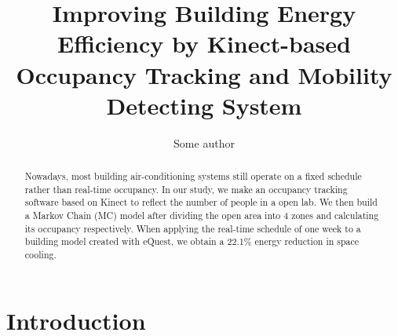 \documentclass{sig-alternate}
\begin{document}
\title{Improving Building Energy Efficiency by Kinect-based Occupancy
  Tracking and Mobility Detecting System}


\author{
\alignauthor
Some author
}


\maketitle{}



\begin{abstract}
  Nowadays, most building air-conditioning systems still operate on a
  fixed schedule rather than real-time occupancy. In our study, we
  make an occupancy tracking software based on Kinect to reflect the
  number of people in a open lab. We then build a Markov Chain (MC)
  model after dividing the open area into 4 zones and calculating its
  occupancy respectively. When applying the real-time schedule of one
  week to a building model created with eQuest, we obtain a 22.1\%
  energy reduction in space cooling.
\end{abstract}









\section{Introduction}
\label{sec:introduction}
\end{document}
